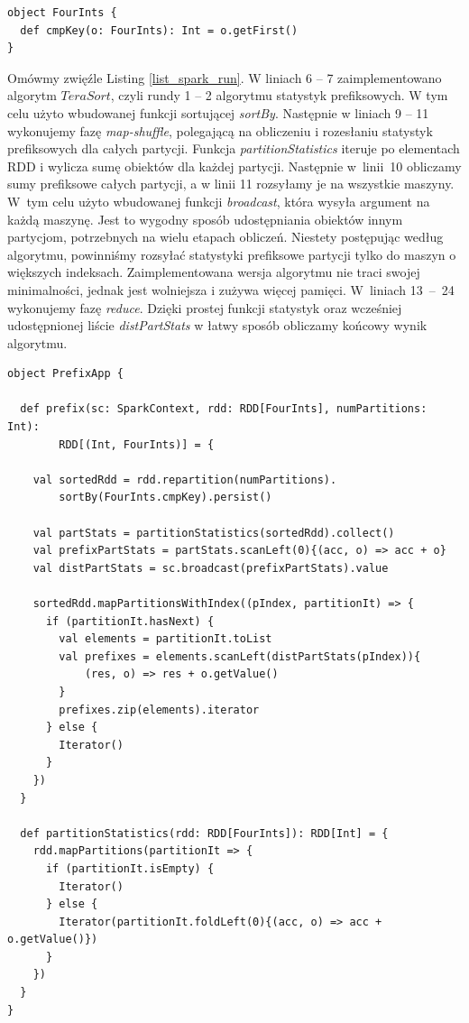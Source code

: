 \documentclass[magisterska]{pracamgr}
\begin{document}
\begin{lstlisting}[language=SmallJava,firstnumber=1,label=list_spark_cmp_four_ints, caption=Funkcja porównująca obiekty klasy FourInts]
object FourInts {
  def cmpKey(o: FourInts): Int = o.getFirst()
}
\end{lstlisting}

Omówmy zwięźle Listing \ref{list_spark_run}. W liniach 6 -- 7 zaimplementowano algorytm \(TeraSort\), czyli rundy 1 -- 2 algorytmu statystyk prefiksowych. W tym celu użyto wbudowanej funkcji sortującej \textit{sortBy}. Następnie w liniach 9 -- 11 wykonujemy fazę \textit{map-shuffle}, polegającą na obliczeniu i rozesłaniu statystyk prefiksowych dla całych partycji. Funkcja \textit{partitionStatistics} iteruje po elementach RDD i wylicza sumę obiektów dla każdej partycji. Następnie \mbox{w linii 10} obliczamy sumy prefiksowe całych partycji, a w linii 11 rozsyłamy je na wszystkie maszyny. W~tym celu użyto wbudowanej funkcji \textit{broadcast}, która wysyła argument na każdą maszynę. Jest to wygodny sposób udostępniania obiektów innym partycjom, potrzebnych na wielu etapach obliczeń. Niestety postępując według algorytmu, powinniśmy rozsyłać statystyki prefiksowe partycji tylko do maszyn o większych indeksach. Zaimplementowana wersja algorytmu nie traci swojej minimalności, jednak jest wolniejsza i zużywa więcej pamięci. W~liniach \mbox{13 -- 24} wykonujemy fazę \textit{reduce}. Dzięki prostej funkcji statystyk oraz wcześniej udostępnionej liście \textit{distPartStats} w łatwy sposób obliczamy końcowy wynik algorytmu.
\newpage
\begin{lstlisting}[language=SmallJava,firstnumber=1,label=list_spark_run,caption=Implementacja algorytmu statystyk prefiksowych bez użycia biblioteki]
object PrefixApp {

  def prefix(sc: SparkContext, rdd: RDD[FourInts], numPartitions: Int):
        RDD[(Int, FourInts)] = {
    
    val sortedRdd = rdd.repartition(numPartitions).
        sortBy(FourInts.cmpKey).persist()

    val partStats = partitionStatistics(sortedRdd).collect()
    val prefixPartStats = partStats.scanLeft(0){(acc, o) => acc + o}
    val distPartStats = sc.broadcast(prefixPartStats).value

    sortedRdd.mapPartitionsWithIndex((pIndex, partitionIt) => {
      if (partitionIt.hasNext) {
        val elements = partitionIt.toList
        val prefixes = elements.scanLeft(distPartStats(pIndex)){
            (res, o) => res + o.getValue()
        }
        prefixes.zip(elements).iterator
      } else {
        Iterator()
      }
    })
  }

  def partitionStatistics(rdd: RDD[FourInts]): RDD[Int] = {
    rdd.mapPartitions(partitionIt => {
      if (partitionIt.isEmpty) {
        Iterator()
      } else {
        Iterator(partitionIt.foldLeft(0){(acc, o) => acc + o.getValue()})
      }
    })
  }
}
\end{lstlisting}
\end{document}
